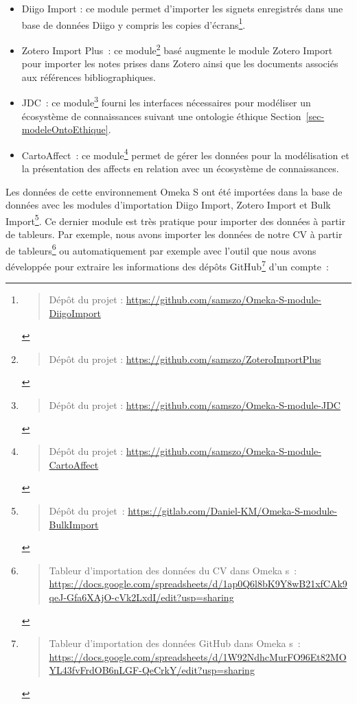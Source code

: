 \documentclass[
  letterpaper,
  DIV=11,
  numbers=noendperiod]{scrreprt}
\providecommand{\tightlist}{%
  \setlength{\itemsep}{0pt}\setlength{\parskip}{0pt}}\usepackage{longtable,booktabs,array}
\begin{document}
\begin{itemize}
  \begin{itemize}
  \tightlist
  \item
    Diigo Import : ce module permet d'importer les signets enregistrés
    dans une base de données Diigo y compris les copies
    d'écrans\footnote{\begin{quote}
      Dépôt du projet :
      \url{https://github.com/samszo/Omeka-S-module-DiigoImport}
      \end{quote}}.
  \item
    Zotero Import Plus~: ce module\footnote{\begin{quote}
      Dépôt du projet : \url{https://github.com/samszo/ZoteroImportPlus}
      \end{quote}} basé augmente le module Zotero Import pour importer
    les notes prises dans Zotero ainsi que les documents associés aux
    références bibliographiques.
  \item
    JDC~: ce module\footnote{\begin{quote}
      Dépôt du projet :
      \url{https://github.com/samszo/Omeka-S-module-JDC}
      \end{quote}} fourni les interfaces nécessaires pour modéliser un
    écosystème de connaissances suivant une ontologie éthique
    Section~\ref{sec-modeleOntoEthique}.
  \item
    CartoAffect~: ce module\footnote{\begin{quote}
      Dépôt du projet :
      \url{https://github.com/samszo/Omeka-S-module-CartoAffect}
      \end{quote}} permet de gérer les données pour la modélisation et
    la présentation des affects en relation avec un écosystème de
    connaissances.
  \end{itemize}
\end{itemize}

Les données de cette environnement Omeka S ont été importées dans la
base de données avec les modules d'importation Diigo Import, Zotero
Import et Bulk Import\footnote{\begin{quote}
  Dépôt du projet~:
  \url{https://gitlab.com/Daniel-KM/Omeka-S-module-BulkImport}
  \end{quote}}. Ce dernier module est très pratique pour importer des
données à partir de tableurs. Par exemple, nous avons importer les
données de notre CV à partir de tableurs\footnote{\begin{quote}
  Tableur d'importation des données du CV dans Omeka s~:
  \url{https://docs.google.com/spreadsheets/d/1ap0Q6l8bK9Y8wB21xfCAk9qeJ-Gfa6XAjO-cVk2LxdI/edit?usp=sharing}
  \end{quote}} ou automatiquement par exemple avec l'outil que nous
avons développée pour extraire les informations des dépôts
GitHub\footnote{\begin{quote}
  Tableur d'importation des données GitHub dans Omeka s~:
  \url{https://docs.google.com/spreadsheets/d/1W92NdhcMurFO96Et82MOYL43fvFrdOB6nLGF-QeCrkY/edit?usp=sharing}
  \end{quote}} d'un compte~:
\end{document}
